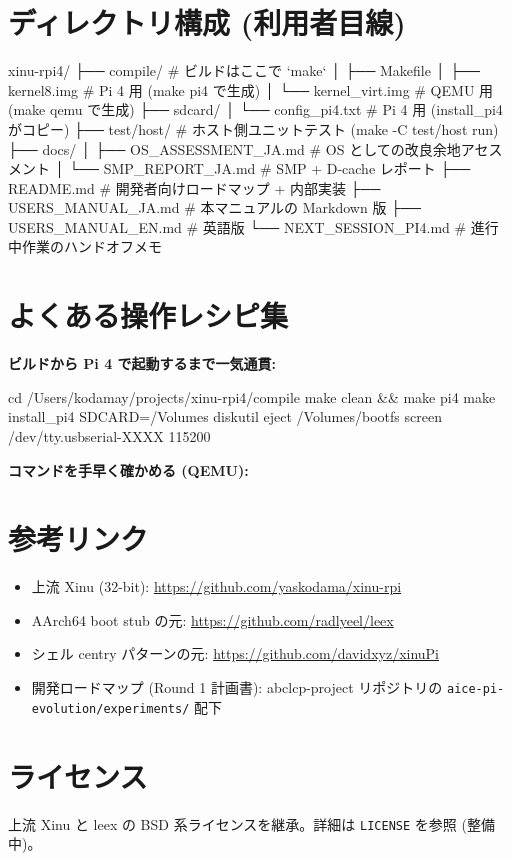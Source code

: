 \documentclass[a4paper,11pt]{ltjsarticle}
\begin{document}
\section{ディレクトリ構成 (利用者目線)}
\begin{code}
xinu-rpi4/
├── compile/                # ビルドはここで `make`
│   ├── Makefile
│   ├── kernel8.img         # Pi 4 用 (make pi4 で生成)
│   └── kernel_virt.img     # QEMU 用 (make qemu で生成)
├── sdcard/
│   └── config_pi4.txt      # Pi 4 用 (install_pi4 がコピー)
├── test/host/              # ホスト側ユニットテスト (make -C test/host run)
├── docs/
│   ├── OS_ASSESSMENT_JA.md # OS としての改良余地アセスメント
│   └── SMP_REPORT_JA.md    # SMP + D-cache レポート
├── README.md               # 開発者向けロードマップ + 内部実装
├── USERS_MANUAL_JA.md      # 本マニュアルの Markdown 版
├── USERS_MANUAL_EN.md      # 英語版
└── NEXT_SESSION_PI4.md     # 進行中作業のハンドオフメモ
\end{code}

\section{よくある操作レシピ集}
\textbf{ビルドから Pi 4 で起動するまで一気通貫:}
\begin{code}
cd /Users/kodamay/projects/xinu-rpi4/compile
make clean && make pi4
make install_pi4 SDCARD=/Volumes
diskutil eject /Volumes/bootfs
screen /dev/tty.usbserial-XXXX 115200
\end{code}
\textbf{コマンドを手早く確かめる (QEMU):}

\section{参考リンク}
\begin{itemize}[leftmargin=1.4em,itemsep=1pt]
\item 上流 Xinu (32-bit): \url{https://github.com/yaskodama/xinu-rpi}
\item AArch64 boot stub の元: \url{https://github.com/radlyeel/leex}
\item シェル centry パターンの元: \url{https://github.com/davidxyz/xinuPi}
\item 開発ロードマップ (Round 1 計画書): abclcp-project リポジトリの
  \verb|aice-pi-evolution/experiments/| 配下
\end{itemize}

\section{ライセンス}
上流 Xinu と leex の BSD 系ライセンスを継承。詳細は \verb|LICENSE| を参照 (整備中)。
\end{document}
